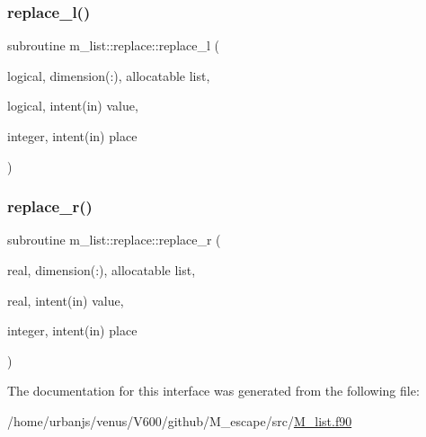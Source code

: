 \mbox{\label{interfacem__list_1_1replace_a0070f232e6ce6a3cff06e1ba4244b075}} 
\subsubsection{\texorpdfstring{replace\+\_\+l()}{replace\_l()}}
{\footnotesize\ttfamily subroutine m\+\_\+list\+::replace\+::replace\+\_\+l (\begin{DoxyParamCaption}\item[{logical, dimension(\+:), allocatable}]{list,  }\item[{logical, intent(in)}]{value,  }\item[{integer, intent(in)}]{place }\end{DoxyParamCaption})\hspace{0.3cm}{\ttfamily [private]}}

\mbox{\label{interfacem__list_1_1replace_ad5be185ea029e2f1c2613e55babc8bd1}} 
\subsubsection{\texorpdfstring{replace\+\_\+r()}{replace\_r()}}
{\footnotesize\ttfamily subroutine m\+\_\+list\+::replace\+::replace\+\_\+r (\begin{DoxyParamCaption}\item[{real, dimension(\+:), allocatable}]{list,  }\item[{real, intent(in)}]{value,  }\item[{integer, intent(in)}]{place }\end{DoxyParamCaption})\hspace{0.3cm}{\ttfamily [private]}}



The documentation for this interface was generated from the following file\+:\begin{DoxyCompactItemize}
\item 
/home/urbanjs/venus/\+V600/github/\+M\+\_\+escape/src/\mbox{\hyperlink{M__list_8f90}{M\+\_\+list.\+f90}}\end{DoxyCompactItemize}
